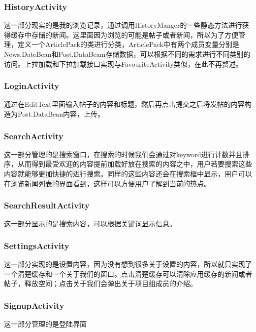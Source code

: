 \subsubsection{HistoryActivity}

这一部分现实的是我的浏览记录，通过调用HistoryManger的一些静态方法进行获得缓存中存储的新闻。这里面因为浏览的可能是帖子或者新闻，所以为了方便管理，定义一个ArticlePack的类进行分类，ArticlePack中有两个成员变量分别是News.DateBean和Post.DataBeam存储数据，可以根据不同的需求进行不同类别的访问。上拉加载和下拉加载接口实现与FavouriteActivity类似，在此不再赘述。

\subsubsection{LoginActivity}

通过在EditText里面输入帖子的内容和标题，然后再点击提交之后将发帖的内容构造为Post.DataBean内容，上传。

\subsubsection{SearchActivity}

这一部分管理的是搜索窗口，在搜索的时候我们会通过对keyword进行计数并且排序，从而得到最受欢迎的内容提前加载好放在搜索的内容之中，用户若要搜索这些内容就能够更加快捷的进行搜索。同样的这些内容还会在搜索框中显示，用户可以在浏览新闻列表的界面看到，这样可以方便用户了解到当前的热点。

\subsubsection{SearchResultActivity}

这一部分显示的是搜索内容，可以根据关键词显示信息。

\subsubsection{SettingsActivity}

这一部分实现的是设置内容，因为没有想到很多关于设置的内容，所以就只实现了一个清楚缓存和一个关于我们的窗口。点击清楚缓存可以清除应用缓存的新闻或者帖子，释放空间；点击关于我们会弹出关于项目组成员的介绍。

\subsubsection{SignupActivity}

这一部分管理的是登陆界面

